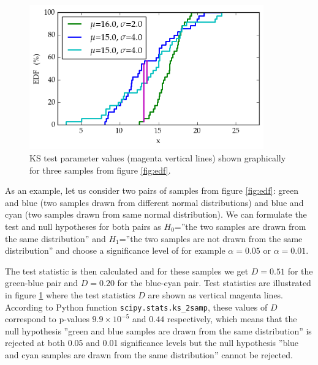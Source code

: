 \documentclass[english, oneside]{HYgradu}
\begin{document}
\begin{figure}
   \centering
   \includegraphics[width=0.9\textwidth]{kuvat/kstest.png}
   \caption{KS test parameter values (magenta vertical lines) shown graphically for three samples from figure \ref{fig:edf}.}
   \label{fig:ks} 
\end{figure}

As an example, let us consider two pairs of samples from figure \ref{fig:edf}: green and blue (two samples drawn from different normal distributions) and blue and cyan (two samples drawn from same normal distribution). We can formulate the test and null hypotheses for both pairs as $H_0$=''the two samples are drawn from the same distribution'' and $H_1$=''the two samples are not drawn from the same distribution'' and choose a significance level of for example $\alpha=0.05$ or $\alpha=0.01$.

\reversemarginpar
{}
The test statistic is then calculated and for these samples we get $D=0.51$ for the green-blue pair and $D=0.20$ for the blue-cyan pair. Test statistics are illustrated in figure \ref{fig:ks} where the test statistics $D$ are shown as vertical magenta lines. According to Python function \texttt{scipy.stats.ks\_2samp}, these values of $D$ correspond to p-values $9.9\times 10^{-5}$ and $0.44$ respectively, which means that the null hypothesis ''green and blue samples are drawn from the same distribution'' is rejected at both 0.05 and 0.01 significance levels but the null hypothesis ''blue and cyan samples are drawn from the same distribution'' cannot be rejected.
\end{document}
